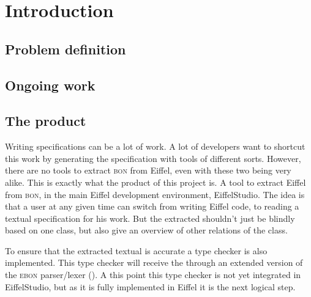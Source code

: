 \chapter{Introduction}
\label{sec:introduction}
\section{Problem definition}
\section{Ongoing work}
\section{The product}
Writing specifications can be a lot of work. A lot of developers want to shortcut this work by generating the specification with tools of different sorts. However, there are no tools to extract \textsc{bon} from Eiffel, even with these two being very alike. This is exactly what the product of this project is. A tool to extract Eiffel from \textsc{bon}, in the main Eiffel development environment, EiffelStudio. The idea is that a user at any given time can switch from writing Eiffel code, to reading a textual \bon{ } specification for his work. But the extracted \bon{ } shouldn't just be blindly based on one class, but also give an overview of other relations of the class.

To ensure that the extracted textual \bon{ } is accurate a type checker is also implemented. This type checker will receive the \bon{ } through an extended version of the \textsc{ebon} parser/lexer (\cite{ebon}). A this point this type checker is not yet integrated in EiffelStudio, but as it is fully implemented in Eiffel it is the next logical step. 